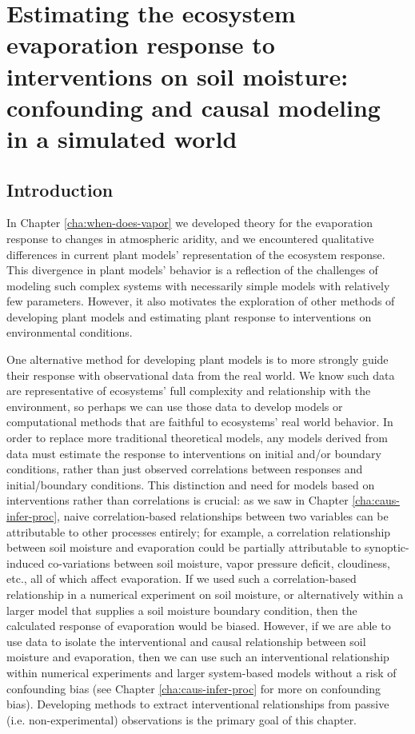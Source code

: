 \chapter{Estimating the ecosystem evaporation response to
  interventions on soil moisture: confounding and causal modeling in a
simulated world}
\label{cha:calc-resp-ecosyst}
\section{Introduction}

In Chapter \ref{cha:when-does-vapor} we developed theory for the
evaporation response to changes in atmospheric aridity, and we
encountered qualitative differences in current plant models'
representation of the ecosystem response. This divergence in plant
models' behavior is a reflection of the challenges of modeling such
complex systems with necessarily simple models with relatively few
parameters. However, it also motivates the exploration of other
methods of developing plant models and estimating plant response to
interventions on environmental conditions.

One alternative method for developing plant models is to more strongly
guide their response with observational data from the real world. We
know such data are representative of ecosystems' full complexity and
relationship with the environment, so perhaps we can use those data to
develop models or computational methods that are faithful to
ecosystems' real world behavior. In order to replace more traditional
theoretical models, any models derived from data must estimate the
response to interventions on initial and/or boundary conditions,
rather than just observed correlations between responses and
initial/boundary conditions. This distinction and need for models
based on interventions rather than correlations is crucial: as we saw
in Chapter \ref{cha:caus-infer-proc}, naive correlation-based
relationships between two variables can be attributable to other
processes entirely; for example, a correlation relationship between
soil moisture and evaporation could be partially attributable to
synoptic-induced co-variations between soil moisture, vapor pressure
deficit, cloudiness, etc., all of which affect evaporation. If we used
such a correlation-based relationship in a numerical experiment on
soil moisture, or alternatively within a larger model that supplies a
soil moisture boundary condition, then the calculated response of
evaporation would be biased. However, if we are able to use data to
isolate the interventional and causal relationship between soil
moisture and evaporation, then we can use such an interventional
relationship within numerical experiments and larger system-based
models without a risk of confounding bias (see Chapter
\ref{cha:caus-infer-proc} for more on confounding bias). Developing
methods to extract interventional relationships from passive
(i.e. non-experimental) observations is the primary goal of this
chapter.

